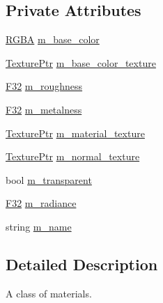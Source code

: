 \subsection*{Private Attributes}
\begin{DoxyCompactItemize}
\item 
\mbox{\hyperlink{structmage_1_1_r_g_b_a}{R\+G\+BA}} \mbox{\hyperlink{classmage_1_1rendering_1_1_material_aab907c723f66f06c8512014e7e217778}{m\+\_\+base\+\_\+color}}
\item 
\mbox{\hyperlink{namespacemage_1_1rendering_a6f3ae54f825328465b0cdde0f0de4a36}{Texture\+Ptr}} \mbox{\hyperlink{classmage_1_1rendering_1_1_material_aaee7a296b1f966a1544a07d21e13b8f6}{m\+\_\+base\+\_\+color\+\_\+texture}}
\item 
\mbox{\hyperlink{namespacemage_aa97e833b45f06d60a0a9c4fc22ae02c0}{F32}} \mbox{\hyperlink{classmage_1_1rendering_1_1_material_a14b420a0bdb8cb1f0fa57aa31bd09ae1}{m\+\_\+roughness}}
\item 
\mbox{\hyperlink{namespacemage_aa97e833b45f06d60a0a9c4fc22ae02c0}{F32}} \mbox{\hyperlink{classmage_1_1rendering_1_1_material_a1ec138a6dfec09ac421517480bd08a75}{m\+\_\+metalness}}
\item 
\mbox{\hyperlink{namespacemage_1_1rendering_a6f3ae54f825328465b0cdde0f0de4a36}{Texture\+Ptr}} \mbox{\hyperlink{classmage_1_1rendering_1_1_material_a4292698d8326e4f28dc45d59e00296dd}{m\+\_\+material\+\_\+texture}}
\item 
\mbox{\hyperlink{namespacemage_1_1rendering_a6f3ae54f825328465b0cdde0f0de4a36}{Texture\+Ptr}} \mbox{\hyperlink{classmage_1_1rendering_1_1_material_a14911430f38bc998c6d0735dc129f234}{m\+\_\+normal\+\_\+texture}}
\item 
bool \mbox{\hyperlink{classmage_1_1rendering_1_1_material_af9f8d0fdb613bce1a4c3683836649bf3}{m\+\_\+transparent}}
\item 
\mbox{\hyperlink{namespacemage_aa97e833b45f06d60a0a9c4fc22ae02c0}{F32}} \mbox{\hyperlink{classmage_1_1rendering_1_1_material_ac79fc4d9a669a552d7319ae713f25871}{m\+\_\+radiance}}
\item 
string \mbox{\hyperlink{classmage_1_1rendering_1_1_material_a16f309220930c59f17b25fd8b0b62446}{m\+\_\+name}}
\end{DoxyCompactItemize}


\subsection{Detailed Description}
A class of materials. 

